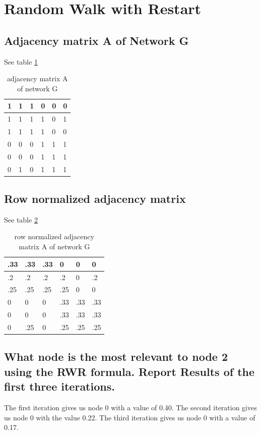 \documentclass[11pt]{article}
\begin{document}
\section{Random Walk with Restart}
\subsection{Adjacency matrix A of Network G}
See table \ref{tab:adj1}
\begin{table}[]
\begin{tabular}{|l|l|l|l|l|l|} \hline
1 & 1 & 1 & 0 & 0 & 0 \\ \hline
1 & 1 & 1 & 1 & 0 & 1 \\ \hline
1 & 1 & 1 & 1 & 0 & 0 \\ \hline
0 & 0 & 0 & 1 & 1 & 1 \\ \hline
0 & 0 & 0 & 1 & 1 & 1 \\ \hline
0 & 1 & 0 & 1 & 1 & 1  \\\hline
\end{tabular}
\caption{adjacency matrix A of network G}
\label{tab:adj1}
\end{table}
\subsection{Row normalized adjacency matrix}
See table \ref{tab:adj2}
\begin{table}[]
\begin{tabular}{|l|l|l|l|l|l|}
\hline
.33 & .33 & .33 & 0   & 0   & 0   \\ \hline
.2  & .2  & .2  & .2  & 0   & .2  \\ \hline
.25 & .25 & .25 & .25 & 0   & 0   \\ \hline
0   & 0   & 0   & .33 & .33 & .33 \\ \hline
0   & 0   & 0   & .33 & .33 & .33 \\ \hline
0   & .25 & 0   & .25 & .25 & .25 \\ \hline
\end{tabular}
\caption{row normalized adjacency matrix A of network G}
\label{tab:adj2}
\end{table}
\subsection{What node is the most relevant to node 2 using the RWR formula. Report Results of the first three iterations.}
The first iteration gives us node 0 with a value of 0.40. The second iteration gives us node 0 with the value 0.22. The third iteration gives us node 0 with a value of 0.17. 
\end{document}
